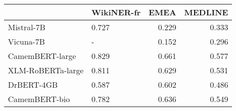 \begin{tabular}{llrr}
\toprule
 & WikiNER-fr & EMEA & MEDLINE \\
\midrule
Mistral-7B & 0.727 & 0.229 & 0.333 \\
Vicuna-7B & - & 0.152 & 0.296 \\
CamemBERT-large & 0.829 & 0.661 & 0.577 \\
XLM-RoBERTa-large & 0.811 & 0.629 & 0.531 \\
DrBERT-4GB & 0.587 & 0.602 & 0.486 \\
CamemBERT-bio & 0.782 & 0.636 & 0.549 \\
\bottomrule
\end{tabular}
